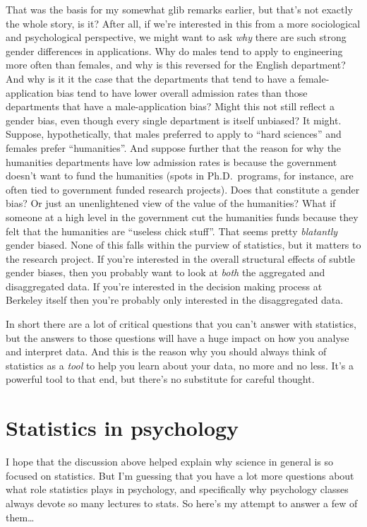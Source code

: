 \documentclass[]{book}
\begin{document}
That was the basis for my somewhat glib remarks earlier, but that's not exactly the whole story, is it? After all, if we're interested in this from a more sociological and psychological perspective, we might want to ask \emph{why} there are such strong gender differences in applications. Why do males tend to apply to engineering more often than females, and why is this reversed for the English department? And why is it it the case that the departments that tend to have a female-application bias tend to have lower overall admission rates than those departments that have a male-application bias? Might this not still reflect a gender bias, even though every single department is itself unbiased? It might.
Suppose, hypothetically, that males preferred to apply to ``hard sciences'' and females prefer ``humanities''. And suppose further that the reason for why the humanities departments have low admission rates is because the government doesn't want to fund the humanities (spots in Ph.D.~programs, for instance, are often tied to government funded research projects). Does that constitute a gender bias? Or just an unenlightened view of the value of the humanities? What if someone at a high level in the government cut the humanities funds because they felt that the humanities are ``useless chick stuff''. That seems pretty \emph{blatantly} gender biased. None of this falls within the purview of statistics, but it matters to the research project. If you're interested in the overall structural effects of subtle gender biases, then you probably want to look at \emph{both} the aggregated and disaggregated data. If you're interested in the decision making process at Berkeley itself then you're probably only interested in the disaggregated data.

In short there are a lot of critical questions that you can't answer with statistics, but the answers to those questions will have a huge impact on how you analyse and interpret data. And this is the reason why you should always think of statistics as a \emph{tool} to help you learn about your data, no more and no less. It's a powerful tool to that end, but there's no substitute for careful thought.

\hypertarget{statistics-in-psychology}{%
\section{Statistics in psychology}\label{statistics-in-psychology}}

I hope that the discussion above helped explain why science in general is so focused on statistics. But I'm guessing that you have a lot more questions about what role statistics plays in psychology, and specifically why psychology classes always devote so many lectures to stats. So here's my attempt to answer a few of them\ldots{}
\end{document}
